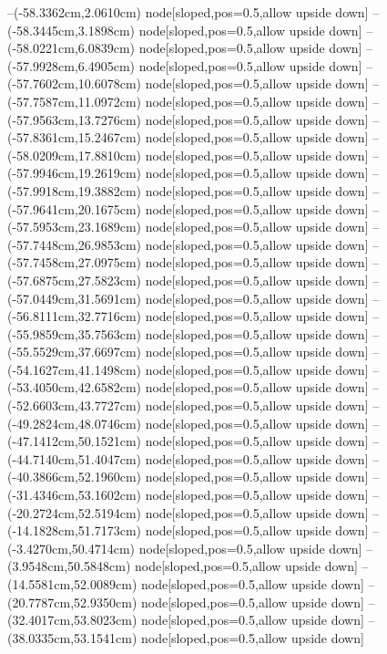 --(-58.3362cm,2.0610cm) node[sloped,pos=0.5,allow upside down]{\ArrowIn}
--(-58.3445cm,3.1898cm) node[sloped,pos=0.5,allow upside down]{\ArrowIn}
--(-58.0221cm,6.0839cm) node[sloped,pos=0.5,allow upside down]{\ArrowIn}
--(-57.9928cm,6.4905cm) node[sloped,pos=0.5,allow upside down]{\arrowIn}
--(-57.7602cm,10.6078cm) node[sloped,pos=0.5,allow upside down]{\ArrowIn}
--(-57.7587cm,11.0972cm) node[sloped,pos=0.5,allow upside down]{\arrowIn}
--(-57.9563cm,13.7276cm) node[sloped,pos=0.5,allow upside down]{\ArrowIn}
--(-57.8361cm,15.2467cm) node[sloped,pos=0.5,allow upside down]{\ArrowIn}
--(-58.0209cm,17.8810cm) node[sloped,pos=0.5,allow upside down]{\ArrowIn}
--(-57.9946cm,19.2619cm) node[sloped,pos=0.5,allow upside down]{\ArrowIn}
--(-57.9918cm,19.3882cm) node[sloped,pos=0.5,allow upside down]{\arrowIn}
--(-57.9641cm,20.1675cm) node[sloped,pos=0.5,allow upside down]{\arrowIn}
--(-57.5953cm,23.1689cm) node[sloped,pos=0.5,allow upside down]{\ArrowIn}
--(-57.7448cm,26.9853cm) node[sloped,pos=0.5,allow upside down]{\ArrowIn}
--(-57.7458cm,27.0975cm) node[sloped,pos=0.5,allow upside down]{\arrowIn}
--(-57.6875cm,27.5823cm) node[sloped,pos=0.5,allow upside down]{\arrowIn}
--(-57.0449cm,31.5691cm) node[sloped,pos=0.5,allow upside down]{\ArrowIn}
--(-56.8111cm,32.7716cm) node[sloped,pos=0.5,allow upside down]{\ArrowIn}
--(-55.9859cm,35.7563cm) node[sloped,pos=0.5,allow upside down]{\ArrowIn}
--(-55.5529cm,37.6697cm) node[sloped,pos=0.5,allow upside down]{\ArrowIn}
--(-54.1627cm,41.1498cm) node[sloped,pos=0.5,allow upside down]{\ArrowIn}
--(-53.4050cm,42.6582cm) node[sloped,pos=0.5,allow upside down]{\ArrowIn}
--(-52.6603cm,43.7727cm) node[sloped,pos=0.5,allow upside down]{\ArrowIn}
--(-49.2824cm,48.0746cm) node[sloped,pos=0.5,allow upside down]{\ArrowIn}
--(-47.1412cm,50.1521cm) node[sloped,pos=0.5,allow upside down]{\ArrowIn}
--(-44.7140cm,51.4047cm) node[sloped,pos=0.5,allow upside down]{\ArrowIn}
--(-40.3866cm,52.1960cm) node[sloped,pos=0.5,allow upside down]{\ArrowIn}
--(-31.4346cm,53.1602cm) node[sloped,pos=0.5,allow upside down]{\ArrowIn}
--(-20.2724cm,52.5194cm) node[sloped,pos=0.5,allow upside down]{\ArrowIn}
--(-14.1828cm,51.7173cm) node[sloped,pos=0.5,allow upside down]{\ArrowIn}
--(-3.4270cm,50.4714cm) node[sloped,pos=0.5,allow upside down]{\ArrowIn}
--(3.9548cm,50.5848cm) node[sloped,pos=0.5,allow upside down]{\ArrowIn}
--(14.5581cm,52.0089cm) node[sloped,pos=0.5,allow upside down]{\ArrowIn}
--(20.7787cm,52.9350cm) node[sloped,pos=0.5,allow upside down]{\ArrowIn}
--(32.4017cm,53.8023cm) node[sloped,pos=0.5,allow upside down]{\ArrowIn}
--(38.0335cm,53.1541cm) node[sloped,pos=0.5,allow upside down]{\ArrowIn}
